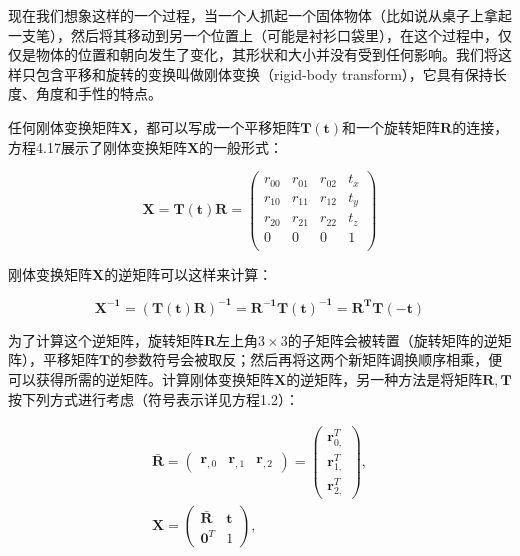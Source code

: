 \documentclass[
  paper=a4,
  ,captions=tableheading
]{scrartcl}
\begin{document}
现在我们想象这样的一个过程，当一个人抓起一个固体物体（比如说从桌子上拿起一支笔），然后将其移动到另一个位置上（可能是衬衫口袋里），在这个过程中，仅仅是物体的位置和朝向发生了变化，其形状和大小并没有受到任何影响。我们将这样只包含平移和旋转的变换叫做刚体变换（rigid-body
transform），它具有保持长度、角度和手性的特点。

任何刚体变换矩阵\(\mathbf{X}\)，都可以写成一个平移矩阵\(\mathbf{T(t)}\)和一个旋转矩阵\(\mathbf{R}\)的连接，方程4.17展示了刚体变换矩阵\(\mathbf{X}\)的一般形式：

\[
  \mathbf{X} = \mathbf{T(t)R}=
  \left(
  \begin{array}{cccc}
      r_{00} & r_{01} & r_{02} & t_x \\
      r_{10} & r_{11} & r_{12} & t_y \\
      r_{20} & r_{21} & r_{22} & t_z \\
      0      & 0      & 0      & 1   \\
    \end{array}
  \right)
  \tag{4.17}
\]

刚体变换矩阵\(\mathbf{X}\)的逆矩阵可以这样来计算：

\[
  \mathbf{X^{-1} = (T(t)R)^{-1} = R^{-1}T(t)^{-1} = R^TT(-t)}
\]

为了计算这个逆矩阵，旋转矩阵\(\mathbf{R}\)左上角\(3 \times 3\)的子矩阵会被转置（旋转矩阵的逆矩阵），平移矩阵\(\mathbf{T}\)的参数符号会被取反；然后再将这两个新矩阵调换顺序相乘，便可以获得所需的逆矩阵。计算刚体变换矩阵\(\mathbf{X}\)的逆矩阵，另一种方法是将矩阵\(\mathbf{R,T}\)按下列方式进行考虑（符号表示详见方程1.2）：

\[
  \begin{array}{c}
    \mathbf{\bar{R}} =
    \left( \begin{array}{ccc}
               \mathbf{r}_{,0} & \mathbf{r}_{,1} & \mathbf{r}_{,2}
             \end{array}  \right)
    =
    \left( \begin{array}{c}
               \mathbf{r}_{0,} ^T \\[1mm]
               \mathbf{r}_{1,} ^T \\[1mm]
               \mathbf{r}_{2,} ^T
             \end{array}  \right) ,
    \\
    \mathbf{X}
    =
    \left( \begin{array}{cc}
               \mathbf{\bar{R}} & \mathbf{t} \\
               \mathbf{0} ^T    & 1
             \end{array}  \right) ,
  \end{array}
  \tag{4.18}
\]
\end{document}
